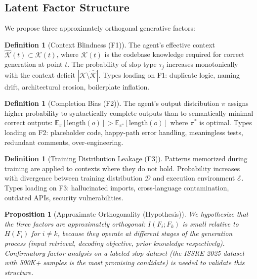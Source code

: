 \documentclass[11pt, a4paper]{article}
\newtheorem{proposition}[theorem]{Proposition}
\theoremstyle{definition}
\newtheorem{definition}[theorem]{Definition}
\theoremstyle{remark}
\begin{document}
\subsection{Latent Factor Structure}

We propose three approximately orthogonal generative factors:

\begin{definition}[Context Blindness (F1)]
The agent's effective context $\hat{\mathcal{K}}(t) \subset \mathcal{K}(t)$, where $\mathcal{K}(t)$ is the codebase knowledge required for correct generation at point $t$. The probability of slop type $\tau_j$ increases monotonically with the context deficit $|\mathcal{K} \setminus \hat{\mathcal{K}}|$. Types loading on F1: duplicate logic, naming drift, architectural erosion, boilerplate inflation.
\end{definition}

\begin{definition}[Completion Bias (F2)]
The agent's output distribution $\pi$ assigns higher probability to syntactically complete outputs than to semantically minimal correct outputs: $\mathbb{E}_\pi[\mathrm{length}(o)] > \mathbb{E}_{\pi^*}[\mathrm{length}(o)]$ where $\pi^*$ is optimal. Types loading on F2: placeholder code, happy-path error handling, meaningless tests, redundant comments, over-engineering.
\end{definition}

\begin{definition}[Training Distribution Leakage (F3)]
Patterns memorized during training are applied to contexts where they do not hold. Probability increases with divergence between training distribution $\mathcal{D}$ and execution environment $\mathcal{E}$. Types loading on F3: hallucinated imports, cross-language contamination, outdated APIs, security vulnerabilities.
\end{definition}

\begin{proposition}[Approximate Orthogonality (Hypothesis)]
\label{prop:orthogonal}
We \emph{hypothesize} that the three factors are approximately orthogonal: $I(F_i; F_k)$ is small relative to $H(F_i)$ for $i \neq k$, because they operate at different stages of the generation process (input retrieval, decoding objective, prior knowledge respectively). Confirmatory factor analysis on a labeled slop dataset (the ISSRE 2025 dataset with 500K+ samples is the most promising candidate) is needed to validate this structure.
\end{proposition}
\end{document}
